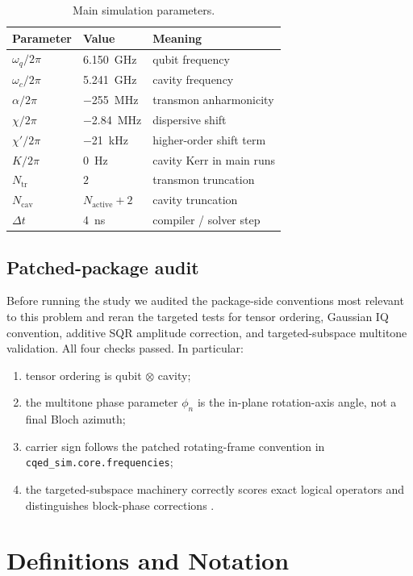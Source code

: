\documentclass[aps,pra,twocolumn,reprint,floatfix,amsmath,amssymb]{revtex4-2}
\begin{document}
\begin{table}[b]
\centering
\footnotesize
\caption{Main simulation parameters.}
\label{tab:params}
\begin{tabular}{@{}lll@{}}
\toprule
Parameter & Value & Meaning \\
\midrule
$\omega_q/2\pi$ & \SI{6.150}{GHz} & qubit frequency \\
$\omega_c/2\pi$ & \SI{5.241}{GHz} & cavity frequency \\
$\alpha/2\pi$ & \SI{-255}{MHz} & transmon anharmonicity \\
$\chi/2\pi$ & \SI{-2.84}{MHz} & dispersive shift \\
$\chi'/2\pi$ & \SI{-21}{kHz} & higher-order shift term \\
$K/2\pi$ & \SI{0}{Hz} & cavity Kerr in main runs \\
$N_{\mathrm{tr}}$ & $2$ & transmon truncation \\
$N_{\mathrm{cav}}$ & $N_{\mathrm{active}}+2$ & cavity truncation \\
$\Delta t$ & \SI{4}{ns} & compiler / solver step \\
\bottomrule
\end{tabular}
\end{table}

\subsection{Patched-package audit}
Before running the study we audited the package-side conventions most relevant to this problem and reran the targeted tests for tensor ordering, Gaussian IQ convention, additive SQR amplitude correction, and targeted-subspace multitone validation.  All four checks passed.  In particular:
\begin{enumerate}
\item tensor ordering is qubit $\otimes$ cavity;
\item the multitone phase parameter $\phi_n$ is the in-plane rotation-axis angle, not a final Bloch azimuth;
\item carrier sign follows the patched rotating-frame convention in \texttt{cqed\_sim.core.frequencies};
\item the targeted-subspace machinery correctly scores exact logical operators and distinguishes block-phase corrections \cite{cqedsim2026}.
\end{enumerate}

\section{Definitions and Notation}
\end{document}
